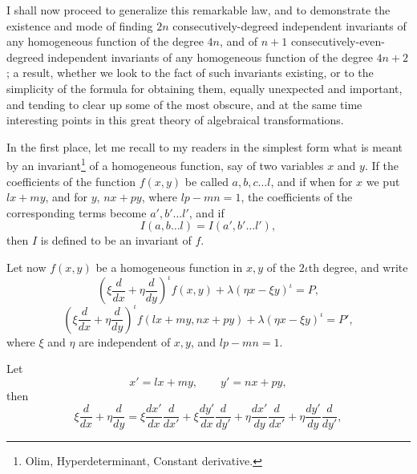 \documentclass[11pt]{article}
\begin{document}
I shall now proceed to generalize this remarkable law, and to demonstrate the existence and mode of finding $2n$ consecutively-degreed independent invariants of any homogeneous function of the degree $4n$, and of $n+1$ consecutively-even-degreed independent invariants of any homogeneous function of the degree $4n+2$; a result, whether we look to the fact of such invariants existing, or to the simplicity of the formula for obtaining them, equally unexpected and important, and tending to clear up some of the most obscure, and at the same time interesting points in this great theory of algebraical transformations.

In the first place, let me recall to my readers in the simplest form what is meant by an invariant\footnote{Olim, Hyperdeterminant, Constant derivative.} of a homogeneous function, say of two variables $x$ and $y$. If the coefficients of the function $f(x,y)$ be called $a,b,c\ldots l$, and if when for $x$ we put $lx+my$, and for $y$, $nx+py$, where $lp-mn=1$, the coefficients of the corresponding terms become $a',b'\ldots l'$, and if
\[
I(a,b\ldots l)=I(a',b'\ldots l'),
\]
then $I$ is defined to be an invariant of $f$.

Let now $f(x,y)$ be a homogeneous function in $x,y$ of the $2\iota$th degree, and write
\[
\left(\xi\frac{d}{dx}+\eta\frac{d}{dy}\right)^\iota f(x,y)+\lambda(\eta x-\xi y)^\iota=P,
\]
\[
\left(\xi\frac{d}{dx}+\eta\frac{d}{dy}\right)^\iota f(lx+my,nx+py)+\lambda(\eta x-\xi y)^\iota=P',
\]
where $\xi$ and $\eta$ are independent of $x,y$, and $lp-mn=1$.

Let
\[
x'=lx+my,\qquad y'=nx+py,
\]
then
\[
\xi\frac{d}{dx}+\eta\frac{d}{dy}
=\xi\frac{dx'}{dx}\frac{d}{dx'}+\xi\frac{dy'}{dx}\frac{d}{dy'}
+\eta\frac{dx'}{dy}\frac{d}{dx'}+\eta\frac{dy'}{dy}\frac{d}{dy'},
\]
\end{document}
